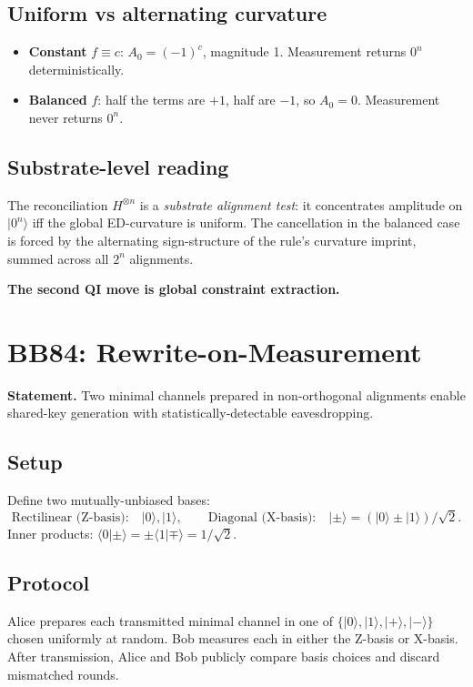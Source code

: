 \documentclass[11pt,a4paper]{article}
\begin{document}
\subsection{Uniform vs alternating curvature}

\begin{itemize}[noitemsep]
  \item \textbf{Constant} $f \equiv c$: $A_0 = (-1)^c$, magnitude 1. Measurement returns $0^n$ deterministically.
  \item \textbf{Balanced} $f$: half the terms are $+1$, half are $-1$, so $A_0 = 0$. Measurement never returns $0^n$.
\end{itemize}

\subsection{Substrate-level reading}

The reconciliation $H^{\otimes n}$ is a \emph{substrate alignment test}: it concentrates amplitude on $|0^n\rangle$ iff the global ED-curvature is uniform. The cancellation in the balanced case is forced by the alternating sign-structure of the rule's curvature imprint, summed across all $2^n$ alignments.

\textbf{The second QI move is global constraint extraction.}

\section{BB84: Rewrite-on-Measurement}

\textbf{Statement.} Two minimal channels prepared in non-orthogonal alignments enable shared-key generation with statistically-detectable eavesdropping.

\subsection{Setup}

Define two mutually-unbiased bases:
\[
\text{Rectilinear (Z-basis):} \quad |0\rangle, |1\rangle, \qquad \text{Diagonal (X-basis):} \quad |\pm\rangle = (|0\rangle \pm |1\rangle)/\sqrt{2}.
\]
Inner products: $\langle 0|\pm\rangle = \pm\langle 1|\mp\rangle = 1/\sqrt{2}$.

\subsection{Protocol}

Alice prepares each transmitted minimal channel in one of $\{|0\rangle, |1\rangle, |+\rangle, |-\rangle\}$ chosen uniformly at random. Bob measures each in either the Z-basis or X-basis. After transmission, Alice and Bob publicly compare basis choices and discard mismatched rounds.
\end{document}
